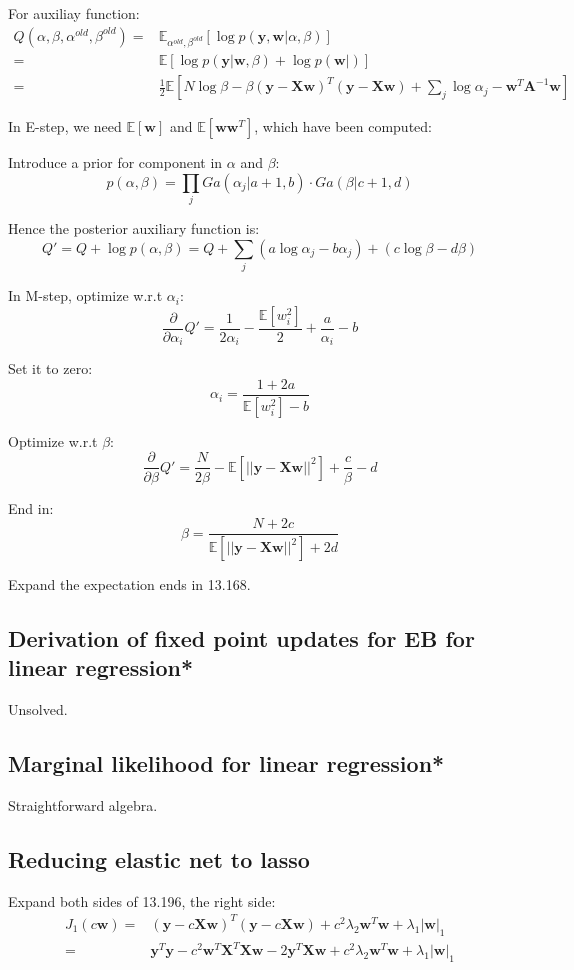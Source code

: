 \documentclass[UTF8]{ctexart}
\begin{document}
For auxiliay function:
\begin{align}
Q(\alpha,\beta,\alpha^{old},\beta^{old})=&\mathbb{E}_{\alpha^{old},\beta^{old}}[\log p(\textbf{y},\textbf{w}|\alpha,\beta)]\nonumber \\
=&\mathbb{E}[\log p(\textbf{y}|\textbf{w},\beta) + \log p(\textbf{w}|)]\nonumber \\
=&\frac{1}{2}\mathbb{E}[N \log \beta -\beta (\textbf{y}-\textbf{X}\textbf{w})^{T}(\textbf{y}-\textbf{X}\textbf{w})+\sum_{j}\log \alpha_{j} - \textbf{w}^{T}\textbf{A}^{-1}\textbf{w}]\nonumber
\end{align}

In E-step, we need $\mathbb{E}[\textbf{w}]$ and $\mathbb{E}[\textbf{w}\textbf{w}^{T}]$, which have been computed:

Introduce a prior for component in $\alpha$ and $\beta$:
$$p(\alpha,\beta)=\prod_{j}Ga(\alpha_{j}|a+1,b) \cdot Ga(\beta|c+1,d)$$

Hence the posterior auxiliary function is:
$$Q'=Q + \log p(\alpha,\beta) = Q + \sum_{j}(a \log \alpha_{j}-b \alpha_{j}) + (c \log \beta - d \beta)$$

In M-step, optimize w.r.t $\alpha_{i}$:
$$\frac{\partial}{\partial \alpha_{i}} Q'=\frac{1}{2\alpha_{i}}-\frac{\mathbb{E}[w_{i}^{2}]}{2} + \frac{a}{\alpha_{i}} -b$$

Set it to zero:
$$\alpha_{i}=\frac{1+2a}{\mathbb{E}[w_{i}^{2}]-b}$$

Optimize w.r.t $\beta$:
$$\frac{\partial}{\partial \beta}Q'=\frac{N}{2\beta}-\mathbb{E}[||\textbf{y}-\textbf{X}\textbf{w}||^{2}]+\frac{c}{\beta}-d$$

End in:
$$\beta = \frac{N+2c}{\mathbb{E}[||\textbf{y}-\textbf{X}\textbf{w}||^{2}]+2d}$$

Expand the expectation ends in 13.168.

\subsection{Derivation of fixed point updates for EB for linear regression*}
Unsolved.


\subsection{Marginal likelihood for linear regression*}
Straightforward algebra.

\subsection{Reducing elastic net to lasso}
Expand both sides of 13.196, the right side:
\begin{align}
J_{1}(c\textbf{w})=&(\textbf{y}-c\textbf{X}\textbf{w})^{T}(\textbf{y}-c\textbf{X}\textbf{w}) + c^{2}\lambda_{2}\textbf{w}^{T}\textbf{w} + \lambda_{1}|\textbf{w}|_{1}\nonumber \\
=&\textbf{y}^{T}\textbf{y} - c^{2}\textbf{w}^{T}\textbf{X}^{T}\textbf{X}\textbf{w} - 2 \textbf{y}^{T}\textbf{X}\textbf{w} + c^{2}\lambda_{2}\textbf{w}^{T}\textbf{w} + \lambda_{1}|\textbf{w}|_{1}\nonumber
\end{align}
\end{document}
